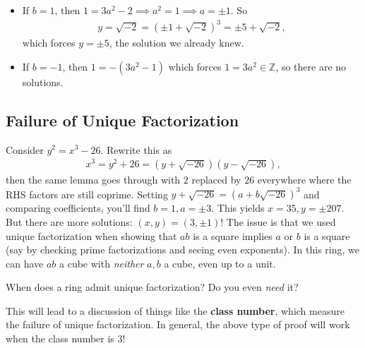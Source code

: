 \begin{example}[Fermat]
\begin{itemize}
\item
  If \(b=1\), then \(1 = 3a^2 -2 \implies a^2 = 1 \implies a = \pm 1\).
  So
  \begin{align*}
  y = \sqrt{-2} = (\pm 1 + \sqrt{-2} )^3 = \pm 5 + \sqrt{-2}
  ,\end{align*}
  which forces \(y=\pm 5\), the solution we already knew.
\item
  If \(b = -1\), then \(1 = -(3a^2 - 1)\) which forces
  \(1=3a^2 \in {\mathbb{Z}}\), so there are no solutions.
\end{itemize}

\end{example}

\hypertarget{failure-of-unique-factorization}{%
\subsection{Failure of Unique
Factorization}\label{failure-of-unique-factorization}}

\begin{example}

Consider \(y^2 = x^3 - 26\). Rewrite this as
\begin{align*}
x^3 = y^2 + 26 = (y + \sqrt{-26} )(y - \sqrt{-26} )
,\end{align*}
then the same lemma goes through with \(2\) replaced by \(26\)
everywhere where the RHS factors are still coprime. Setting
\(y + \sqrt{-26} = (a + b \sqrt{-26} )^3\) and comparing coefficients,
you'll find \(b=1, a = \pm 3\). This yields \(x=35, y=\pm 207\). But
there are more solutions: \((x, y) = (3, \pm 1)\)! The issue is that we
used unique factorization when showing that \(ab\) is a square implies
\(a\) or \(b\) is a square (say by checking prime factorizations and
seeing even exponents). In this ring, we can have \(ab\) a cube with
\emph{neither} \(a,b\) a cube, even up to a unit.

\end{example}

\begin{question}

When does a ring admit unique factorization? Do you even \emph{need} it?

\end{question}

\begin{remark}

This will lead to a discussion of things like the \textbf{class number},
which measure the failure of unique factorization. In general, the above
type of proof will work when the class number is 3!

\end{remark}

